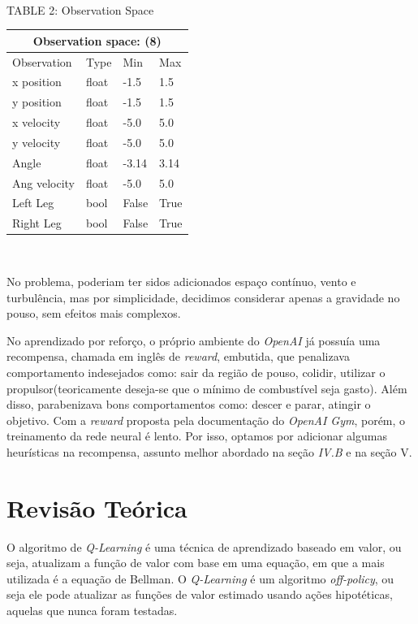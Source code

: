\documentclass[letterpaper, 10 pt, conference]{ieeeconf}  %
\begin{document}
\\
\begin{center}
TABLE 2: Observation Space
\begin{tabular}
{ |p{2.0cm}||p{1.0cm}|p{1.0cm}|p{1.0cm}|  }
 \hline
 \multicolumn{4}{|c|}{Observation space: (8)} \\
 \hline
 Observation& Type&Min&Max\\
 \hline
 x position & float&-1.5&1.5\\
 y position & float&-1.5&1.5\\
 x velocity & float&-5.0&5.0\\
 y velocity & float&-5.0&5.0\\
 Angle   & float&-3.14&3.14\\
 Ang velocity & float&-5.0&5.0\\
  Left Leg & bool& False&True\\
 Right Leg & bool& False&True\\
 \hline
\end{tabular}
\end{center}
\\
\textfloatsep


No problema, poderiam ter sidos adicionados espaço contínuo, vento e turbulência, mas por simplicidade, decidimos considerar apenas a gravidade no pouso, sem efeitos mais complexos. 

No aprendizado por reforço, o próprio ambiente do \emph{OpenAI} já possuía uma recompensa, chamada em inglês de \emph{reward}, embutida, que penalizava comportamento indesejados como: sair da região de pouso, colidir, utilizar o propulsor(teoricamente deseja-se que o mínimo de combustível seja gasto). Além disso, parabenizava bons comportamentos como: descer e parar, atingir o objetivo. Com a \emph{reward} proposta pela documentação do \emph{OpenAI Gym}, porém, o treinamento da rede neural é lento. Por isso, optamos por adicionar algumas heurísticas na recompensa, assunto melhor abordado na seção \emph{IV.B} e na seção V.

\section{Revisão Teórica}

O algoritmo de \emph{Q-Learning} é uma técnica de aprendizado baseado em valor, ou seja, atualizam a função de valor com base em uma equação, em que a mais utilizada é a equação de Bellman. O \emph{Q-Learning} é um algoritmo \emph{off-policy}, ou seja ele pode atualizar as funções de valor estimado usando ações hipotéticas, aquelas que nunca foram testadas. 
\end{document}
